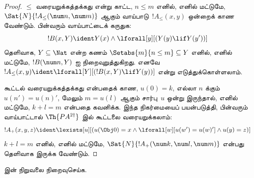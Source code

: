 \documentclass[../../../include/open-logic-section]{subfiles}
\begin{document}
\begin{proof}
$\le$ வரையறுக்கத்தக்கது என்று காட்ட, $n \le m$ எனில், எனில்
மட்டுமே, $\Sat{N}{!A_\le(\num n, \num m)}$ ஆகும்
வாய்பாடு~$!A_\le(x, y)$ ஒன்றைக் காண வேண்டும். பின்வரும் வாய்பாட்டைக்
கருதுக:
\[
!B(x, Y) \ident Y(x) \land \lforall[y][(Y(y) \lif Y(y'))]
\]
தெளிவாக, $Y \subseteq \Nat$ என்ற கணம்
$\Setabs{m}{n \le m} \subseteq Y$ எனில், எனில் மட்டுமே,
$!B(\num n, Y)$ ஐ நிறைவுறுத்துகிறது. எனவே
$!A_\le(x, y) \ident \lforall[Y][(!B(x, Y) \lif Y(y))]$ என்று
எடுத்துக்கொள்ளலாம்.

கூட்டல் வரையறுக்கத்தக்கது என்பதைக் காண, $u(0)=k$,
எல்லா $n$ க்கும் $u(n')=u(n)'$, மேலும் $m = u(l)$ ஆகும்
சார்பு~$u$ ஒன்று இருந்தால், எனில் மட்டுமே, $k+l=m$ என்பதை
கவனிக்க. இந்த நிகர்மையைப் பயன்படுத்தி, பின்வரும் வாய்பாட்டால்
$\Th{PA^{2\dagger}}$ இல் கூட்டலை வரையறுக்கலாம்:
\[
!A_+(x,y,z) \ident \lexists[u][(u(\Obj 0)=x \land \lforall[w][u(w')=u
 (w)'] \land u(y)=z)]
\]
$k+l=m$ எனில், எனில் மட்டுமே,
$\Sat{N}{!A_+(\num k, \num l, \num m)}$ என்பது தெளிவாக இருக்க வேண்டும்.
\end{proof}

\begin{prob}
 இன் நிறுவலை நிறைவுசெய்க.
\end{prob}
\end{document}
